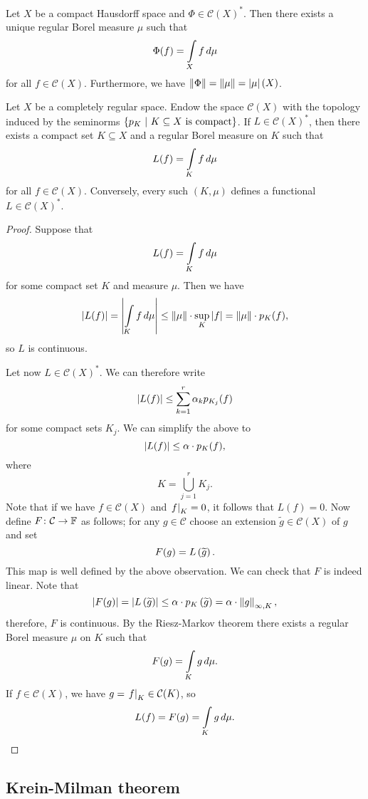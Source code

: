 \begin{izrek}
Let $X$ be a compact Hausdorff space and
$\Phi \in \mathcal{C}(X)^*$. Then there exists a unique regular
Borel measure $\mu$ such that
\[
\Phi(f) = \int\limits_X f\,d\mu
\]
for all $f \in \mathcal{C}(X)$. Furthermore, we have
$\left\lVert \Phi\right\rVert = \left\lVert \mu\right\rVert = \left\lvert \mu\right\rvert(X)$.
\end{izrek}

\begin{trditev}
Let $X$ be a completely regular space. Endow the space
$\mathcal{C}(X)$ with the topology induced by the seminorms
$\left\{p_K~\middle\vert~\text{$K \subseteq X$ is compact}\right\}$. If
$L \in \mathcal{C}(X)^*$, then there exists a compact set
$K \subseteq X$ and a regular Borel measure on $K$ such that
\[
L(f) = \int\limits_K f\,d\mu
\]
for all $f \in \mathcal{C}(X)$. Conversely, every such $(K, \mu)$
defines a functional $L \in \mathcal{C}(X)^*$.
\end{trditev}

\begin{proof}
Suppose that
\[
L(f) = \int\limits_K f\,d\mu
\]
for some compact set $K$ and measure $\mu$. Then we have
\[
\left\lvert L(f)\right\rvert =
\left\lvert \int\limits_K f\,d\mu\right\rvert \leq
\left\lVert \mu\right\rVert \cdot \sup_K \left\lvert f\right\rvert = \left\lVert \mu\right\rVert \cdot p_K(f),
\]
so $L$ is continuous.

Let now $L \in \mathcal{C}(X)^*$. We can therefore write
\[
\left\lvert L(f)\right\rvert \leq \sum_{k=1}^r \alpha_k p_{K_j}(f)
\]
for some compact sets $K_j$. We can simplify the above to
\[
\left\lvert L(f)\right\rvert \leq \alpha \cdot p_K(f),
\]
where
\[
K = \bigcup_{j=1}^r K_j.
\]
Note that if we have $f \in \mathcal{C}(X)$ and
$\left. f\right|_{K}^{} = 0$, it follows that $L(f) = 0$. Now define
$F \colon \mathcal{C} \to \mathbb{F}$ as follows; for any
$g \in \mathcal{C}$ choose an extension
$\widetilde{g} \in \mathcal{C}(X)$ of $g$ and set
\[
F(g) = L \left(\widetilde{g}\right).
\]
This map is well defined by the above observation. We can check
that $F$ is indeed linear. Note that
\[
\left\lvert F(g)\right\rvert =
\left\lvert L \left(\widetilde{g}\right)\right\rvert \leq
\alpha \cdot p_K \left(\widetilde{g}\right) =
\alpha \cdot \left\lVert g\right\rVert_{\infty, K},
\]
therefore, $F$ is continuous. By the Riesz-Markov theorem there
exists a regular Borel measure $\mu$ on $K$ such that
\[
F(g) = \int\limits_K g\,d\mu.
\]
If $f \in \mathcal{C}(X)$, we have
$g = \left. f\right|_{K}^{} \in \mathcal{C}(K)$, so
\[
L(f) = F(g) = \int\limits_K g\,d\mu. \qedhere
\]
\end{proof}

\newpage

\subsection{Krein-Milman theorem}

